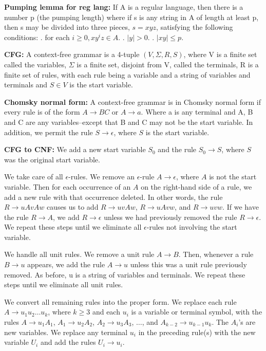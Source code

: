 \documentclass[10pt]{article}
\begin{document}
\textbf{Pumping lemma for reg lang:} If A is a regular language, then there is a number p (the pumping length) where if s is any string in A of length at least p, then s may be divided into three pieces, $s = xyz$, satisfying the following conditions: . for each $i \geq 0, xy^iz \in A$. . $|y| > 0$. . $|xy| \leq p$.

\textbf{CFG:} A context-free grammar is a 4-tuple $(V,\Sigma,R,S)$, where V is a finite set called the variables, $\Sigma$ is a finite set, disjoint from V, called the terminals, R is a finite set of rules, with each rule being a variable and a string of variables and terminals and $S \in V$ is the start variable.

\textbf{Chomsky normal form:} A context-free grammar is in Chomsky normal form if every rule is of the form $A \rightarrow BC$ or $A \rightarrow a$. Where a is any terminal and A, B and C are any variables--except that B and C may not be the start variable. In addition, we permit the rule $S \rightarrow \epsilon$, where $S$ is the start variable.

\textbf{CFG to CNF: } We add a new start variable $S_0$ and the rule $S_0 \rightarrow S$, where $S$ was the original start variable.

We take care of all $\epsilon$-rules. We remove an $\epsilon$-rule $A \rightarrow \epsilon$, where $A$ is not the start variable. Then for each occurrence of an $A$ on the right-hand side of a rule, we add a new rule with that occurrence deleted. In other words, the rule $R \rightarrow uAvAw$ causes us to add $R \rightarrow uvAw$, $R \rightarrow uAvw$, and $R \rightarrow uvw$. If we have the rule $R \rightarrow A$, we add $R \rightarrow \epsilon$ unless we had previously removed the rule $R \rightarrow \epsilon$. We repeat these steps until we eliminate all $\epsilon$-rules not involving the start variable.

We handle all unit rules. We remove a unit rule $A \rightarrow B$. Then, whenever a rule $B \rightarrow u$ appears, we add the rule $A \rightarrow u$ unless this was a unit rule previously removed. As before, u is a string of variables and terminals. We repeat these steps until we eliminate all unit rules.

We convert all remaining rules into the proper form. We replace each rule $A \rightarrow u_1u_2 \dots u_k$, where $k \geq 3$ and each $u_i$ is a variable or terminal symbol, with the rules $A \rightarrow u_1A_1$, $A_1 \rightarrow u_2A_2$, $A_2 \rightarrow u_3A_3$, $\dots$, and $A_{k-2} \rightarrow u_{k-1}u_k$. The $A_i$'s are new variables. We replace any terminal $u_i$ in the preceding rule(s) with the new variable $U_i$ and add the rules $U_i \rightarrow u_i$.
\end{document}
